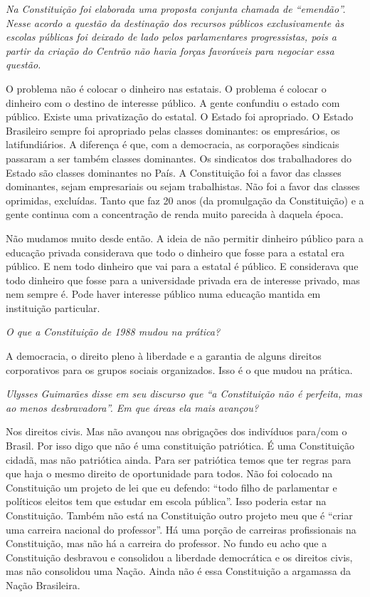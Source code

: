\medskip

\noindent\emph{Na Constituição foi elaborada uma proposta conjunta chamada de
``emendão''. Nesse acordo a questão da destinação dos recursos públicos
exclusivamente às escolas públicas foi deixado de lado pelos
parlamentares progressistas, pois a partir da criação do Centrão não
havia forças favoráveis para negociar essa questão.}

O problema não é colocar o dinheiro nas estatais. O
problema é colocar o dinheiro com o destino de interesse público. A
gente confundiu o estado com público. Existe uma privatização do
estatal. O Estado foi apropriado. O Estado Brasileiro sempre foi
apropriado pelas classes dominantes: os empresários, os latifundiários.
A diferença é que, com a democracia, as corporações sindicais passaram a
ser também classes dominantes. Os sindicatos dos trabalhadores do Estado
são classes dominantes no País. A Constituição foi a favor das classes
dominantes, sejam empresariais ou sejam trabalhistas. Não foi a favor
das classes oprimidas, excluídas. Tanto que faz 20 anos (da promulgação
da Constituição) e a gente continua com a concentração de renda muito
parecida à daquela época.

Não mudamos muito desde então. A ideia de não permitir dinheiro público
para a educação privada considerava que todo o dinheiro que fosse para a
estatal era público. E nem todo dinheiro que vai para a estatal é
público. E considerava que todo dinheiro que fosse para a universidade
privada era de interesse privado, mas nem sempre é. Pode haver interesse
público numa educação mantida em instituição particular.

\medskip

\noindent\emph{O que a Constituição de 1988 mudou na prática?}

A democracia, o direito pleno à liberdade e a garantia
de alguns direitos corporativos para os grupos sociais organizados. Isso
é o que mudou na prática.

\medskip

\noindent\emph{Ulysses Guimarães disse em seu discurso que ``a Constituição não
é perfeita, mas ao menos desbravadora''. Em que áreas ela mais avançou?}

Nos direitos civis. Mas não avançou nas obrigações dos
indivíduos para/com o Brasil. Por isso digo que não é uma constituição
patriótica. É uma Constituição cidadã, mas não patriótica ainda. Para
ser patriótica temos que ter regras para que haja o mesmo direito de
oportunidade para todos. Não foi colocado na Constituição um projeto de
lei que eu defendo: ``todo filho de parlamentar e políticos eleitos tem
que estudar em escola pública''. Isso poderia estar na Constituição.
Também não está na Constituição outro projeto meu que é ``criar uma
carreira nacional do professor''. Há uma porção de carreiras
profissionais na Constituição, mas não há a carreira do professor. No
fundo eu acho que a Constituição desbravou e consolidou a liberdade
democrática e os direitos civis, mas não consolidou uma Nação. Ainda não
é essa Constituição a argamassa da Nação Brasileira.

